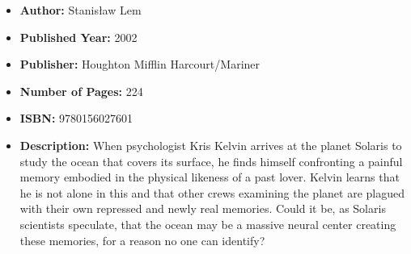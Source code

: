 \documentclass{tufte-handout}
\begin{document}
\begin{itemize}
    \item[] \textbf{Author:} Stanisław Lem
    \item[] \textbf{Published Year:} 2002 
    \item[] \textbf{Publisher:} Houghton Mifflin Harcourt/Mariner
    \item[] \textbf{Number of Pages:} 224      
    \item[] \textbf{ISBN:} 9780156027601
    \item[] \textbf{Description:} When psychologist Kris Kelvin arrives at the planet Solaris to study the ocean that covers its surface, he finds himself confronting a painful memory embodied in the physical likeness of a past lover. Kelvin learns that he is not alone in this and that other crews examining the planet are plagued with their own repressed and newly real memories. Could it be, as Solaris scientists speculate, that the ocean may be a massive neural center creating these memories, for a reason no one can identify?
\end{itemize}
\end{document}
